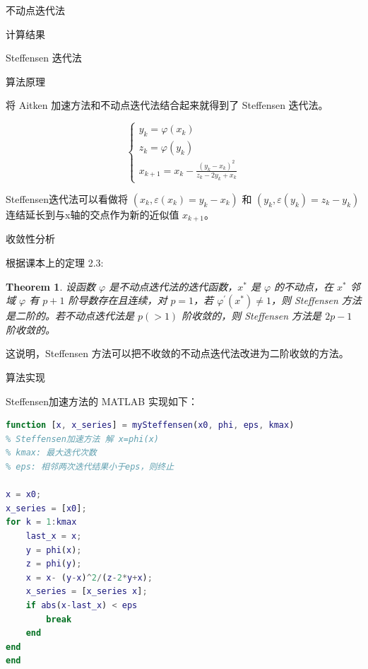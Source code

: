 \documentclass[a4paper]{article}
\newtheorem{myThm}{Theorem}
\begin{document}
\begin{multicols}{2}
\begin{section}{不动点迭代法}
\begin{subsection}{计算结果}
	\end{subsection}

\end{section}


\begin{section}{Steffensen 迭代法}

	\begin{subsection}{算法原理}
		
		将 Aitken 加速方法和不动点迭代法结合起来就得到了 Steffensen 迭代法。
		
		$$\left\{\begin{array}{l}{y_{k}=\varphi\left(x_{k}\right)} \\ {z_{k}=\varphi\left(y_{k}\right)} \\ {x_{k+1}=x_{k}-\frac{\left(y_{k}-x_{k}\right)^{2}}{z_{k}-2 y_{k}+x_{k}}}\end{array}\right.$$
		
		Steffensen迭代法可以看做将 $(x_k, \varepsilon(x_k)=y_k-x_k )$ 和 $(y_k, \varepsilon(y_k)=z_k-y_k )$ 连结延长到与x轴的交点作为新的近似值 $x_{k+1}$。
		
	\end{subsection}

	\begin{subsection}{收敛性分析}
		
		根据课本上的定理 2.3:
		
		\begin{myThm}
			设函数 $\varphi$ 是不动点迭代法的迭代函数，$x^*$ 是 $\varphi$ 的不动点，在 $x^*$ 邻域 $\varphi$ 有 $p+1$ 阶导数存在且连续，对 $p=1$，若 $\varphi^\prime(x^*)\neq 1$，则 Steffensen 方法是二阶的。若不动点迭代法是 $p(>1)$ 阶收敛的，则 Steffensen 方法是 $2p-1$ 阶收敛的。 
		\end{myThm}
		
		这说明，Steffensen 方法可以把不收敛的不动点迭代法改进为二阶收敛的方法。
		
	\end{subsection}
	
	\begin{subsection}{算法实现}
	
		Steffensen加速方法的 MATLAB 实现如下：
		
		\begin{lstlisting}[language=Matlab]
function [x, x_series] = mySteffensen(x0, phi, eps, kmax)
% Steffensen加速方法 解 x=phi(x)
% kmax: 最大迭代次数
% eps: 相邻两次迭代结果小于eps，则终止

x = x0;
x_series = [x0];
for k = 1:kmax
    last_x = x;
    y = phi(x);
    z = phi(y);
    x = x- (y-x)^2/(z-2*y+x);
    x_series = [x_series x];
    if abs(x-last_x) < eps
        break
    end
end
end	
		\end{lstlisting}


\end{subsection}
\end{section}
\end{multicols}
\end{document}

